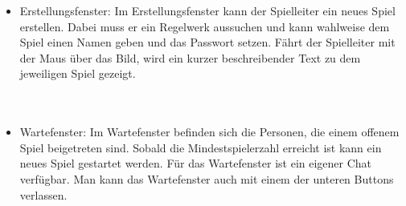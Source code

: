 \documentclass{article}
\begin{document}
\begin{itemize}
		\newpage
	\item \gls{Erstellungsfenster}: Im \gls{Erstellungsfenster} kann der \gls{Spielleiter} ein neues Spiel erstellen. Dabei muss er ein 			\gls{Regelwerk} aussuchen und kann wahlweise dem Spiel einen Namen geben und das Passwort setzen. Fährt 					der \gls{Spielleiter} mit der Maus über das Bild, wird ein kurzer beschreibender Text zu dem jeweiligen Spiel 					gezeigt.\\
		\ \\
		\ \\
	\item \gls{Wartefenster}: Im \gls{Wartefenster} befinden sich die Personen, die einem offenem Spiel beigetreten sind. Sobald 					die Mindestspielerzahl erreicht ist kann ein neues Spiel gestartet werden. Für das \gls{Wartefenster} ist ein eigener 					Chat verfügbar. Man kann das \gls{Wartefenster} auch mit einem der unteren Buttons verlassen. \\
		\ \\

\end{itemize}
\end{document}

